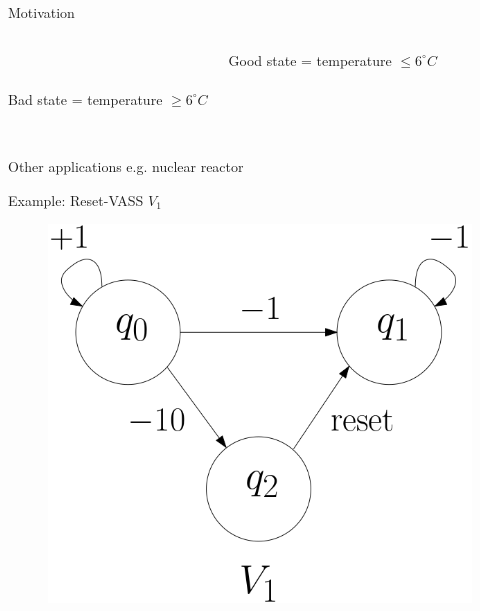\documentclass{beamer}
\begin{document}
\begin{frame}{Motivation}
\begin{columns}[T]
\phantom{Fridge.png} \\
\phantom{Fridge.png} \\
{\sf Bad} state = temperature $\geq 6^\circ C$ \newline

 {\sf Good} state = temperature $\leq 6^\circ C$ \\

\end{columns}

\pause

\phantom{Fridge.png} \\
Other applications e.g.  nuclear reactor 

  \end{frame}
  \begin{frame}{Example: Reset-VASS $V_1$}
  
  
   \begin{center}
 	\begin{figure}
 	\vspace{.06cm}
\includegraphics[width=.50\textwidth]{FigA}
	\end{figure}
\end{center}  



  \end{frame}
\end{document}
